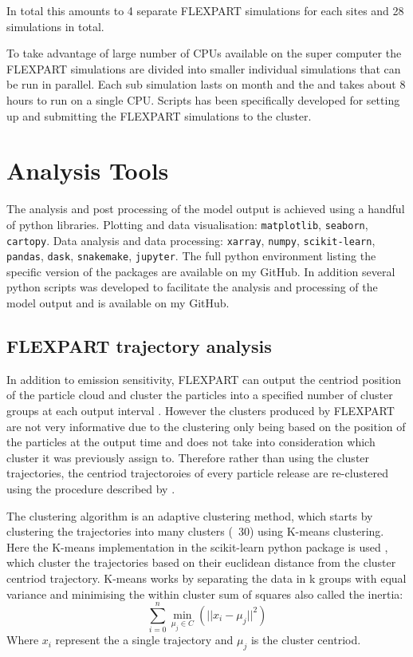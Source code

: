 In total this amounts to 4 separate FLEXPART simulations for each sites and 28 simulations in total. 

To take advantage of large number of CPUs available on the super computer the FLEXPART simulations are divided into smaller individual simulations that can be run in parallel. Each sub simulation lasts on month and the and takes about 8 hours to run on a single CPU. Scripts has been specifically developed for setting up and submitting the FLEXPART simulations to the cluster. 

\section{Analysis Tools}
The analysis and post processing of the model output is achieved using a handful of python libraries. Plotting and data visualisation:  \verb|matplotlib|, \verb|seaborn|, \verb|cartopy|. Data analysis and data processing: \verb|xarray|, \verb|numpy|, \verb|scikit-learn|, \verb|pandas|, \verb|dask|, \verb|snakemake|, \verb|jupyter|. The full python environment listing the specific version of the packages are available on my GitHub. In addition several python scripts was developed to facilitate the analysis and processing of the model output and is available on my GitHub.        

\subsection{FLEXPART trajectory analysis}
In addition to emission sensitivity, FLEXPART can output the centriod position of the particle cloud and cluster the particles into a specified number of cluster groups at each output interval \parencite{stohl_replacement_2002}. However the clusters produced by FLEXPART are not very informative due to the clustering only being based on the position of the particles at the output time and does not take into consideration which cluster it was previously assign to. Therefore rather than using the cluster trajectories, the centriod trajectoroies of every particle release are re-clustered using the procedure described by \textcite{dorling1992cluster}. 

The \textcite{dorling1992cluster} clustering algorithm is an adaptive clustering method, which starts by clustering the trajectories into many clusters (~30) using K-means clustering. Here the K-means implementation in the scikit-learn python package is used \parencite{scikit-learn}, which cluster the trajectories based on their euclidean distance from the cluster centriod trajectory. K-means works by separating the data in k groups with equal variance and minimising the within cluster sum of squares also called the inertia: 
\begin{equation}
    \sum_{i=0}^{n}\min_{\mu_j \in C}(||x_i - \mu_j||^2)
\end{equation}
Where $x_i$ represent the a single trajectory and $\mu_j$ is the cluster centriod. 

